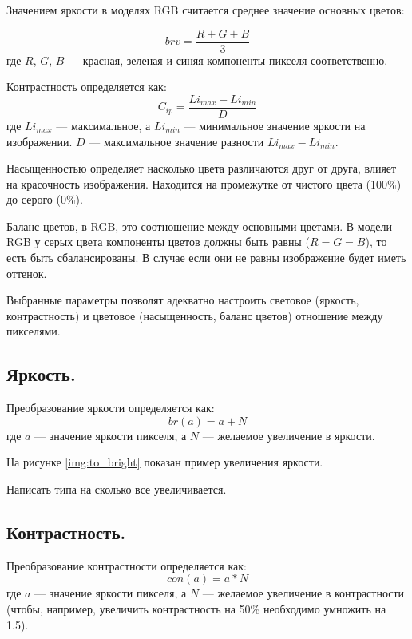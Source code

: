 Значением яркости в моделях RGB считается среднее значение основных цветов:

\begin{equation}
	\label{br}
	brv = \frac{R + G + B}{3}
\end{equation}
где $R$, $G$, $B$ --- красная, зеленая и синяя компоненты пикселя соответственно. \cite{colorfaq}

Контрастность определяется как:
\begin{equation}
	\label{condef}
	C_{ip} = \frac{Li_{max} - Li_{min}}{D}
\end{equation}
где $Li_{max}$ --- максимальное, а $Li_{min}$ --- минимальное значение яркости на изображении. $D$ --- максимальное значение разности $Li_{max} - Li_{min}$. \cite{contrastdef}

Насыщенностью определяет насколько цвета различаются друг от друга, влияет на красочность изображения. Находится на промежутке от чистого цвета (100\%) до серого (0\%). \cite{satdef}

Баланс цветов, в RGB, это соотношение между основными цветами. В модели RGB у серых цвета компоненты цветов должны быть равны ($R = G = B$), то есть быть сбалансированы. В случае если они не равны изображение будет иметь оттенок. \cite{colorb}

Выбранные параметры позволят адекватно настроить световое (яркость, контрастность) и цветовое (насыщенность, баланс цветов) отношение между пикселями. 

\subsection{Яркость.}

Преобразование яркости определяется как:
\begin{equation}
	\label{brightness}
	br(a) = a + N
\end{equation}
где $a$ --- значение яркости пикселя, а $N$ --- желаемое увеличение в яркости. \cite{brk}

На рисунке \ref{img:to_bright} показан пример увеличения яркости.

Написать типа на сколько все увеличивается.

\subsection{Контрастность.}

Преобразование контрастности определяется как:
\begin{equation}
	\label{contrast}
	con(a) = a * N
\end{equation}
где $a$ --- значение яркости пикселя, а $N$ --- желаемое увеличение в контрастности (чтобы, например, увеличить контрастность на 50\% необходимо умножить на 1.5). \cite{brk}

